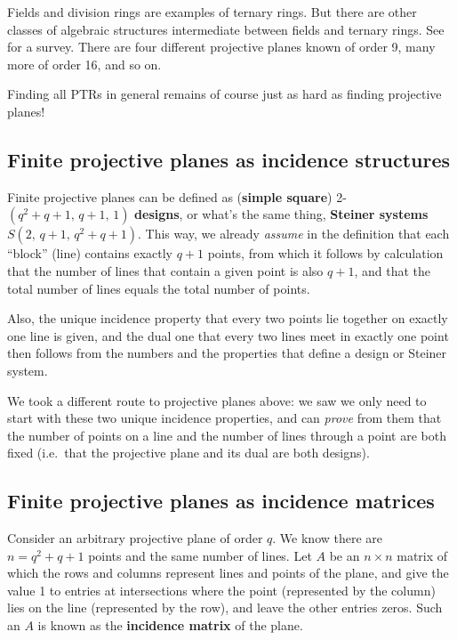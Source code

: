 \documentclass[12pt]{article}
\def\comma{,\,\allowbreak}
\begin{document}
Fields and division rings are examples of ternary rings.  But there are other classes of algebraic structures intermediate between fields and ternary rings.  See \cite{dRe96} for a survey. There are four different projective planes known of order 9, many more of order 16, and so on.

Finding all PTRs in general remains of course just as hard as finding projective planes!

\clearpage
\subsection*{Finite projective planes as incidence structures}

Finite projective planes can be defined as
({\bf simple square}) 2-$(q^2+q+1\comma q+1\comma 1)$ {\bf designs},
or what's the same thing, {\bf Steiner systems} $S(2\comma q+1\comma q^2+q+1)$.
This way, we already {\em assume\/} in the definition that each ``block''
({\sc line}) contains exactly $q+1$ {\sc point}s, from which it follows by calculation that
the number of {\sc line}s that contain a given {\sc point} is also $q+1$, and that the
total number of {\sc line}s equals the total number of {\sc point}s.

Also, the unique incidence property that every two {\sc point}s lie together on
exactly one {\sc line} is given, and the dual one that every two {\sc line}s meet in
exactly one {\sc point} then follows from the numbers and the properties that define
a design or Steiner system.

We took a different route to projective planes above: we saw we only need to start with
these two unique incidence properties, and can {\em prove\/} from them that
the number of {\sc point}s on a {\sc line} and the number of {\sc line}s through a {\sc point} are both
fixed (i.e.\ that the projective plane and its dual are both designs).

\clearpage
\subsection*{Finite projective planes as incidence matrices}

Consider an arbitrary projective plane of order $q$.
We know there are $n=q^2+q+1$ points and the same number of lines. Let $A$
be an $n\times n$ matrix of which the rows and columns represent lines and
points of the plane, and give the value 1 to entries at intersections where
the point (represented by the column) lies on the line (represented by the
row), and leave the other entries zeros. Such an $A$ is known as the
{\bf incidence matrix} of the plane.
\end{document}

